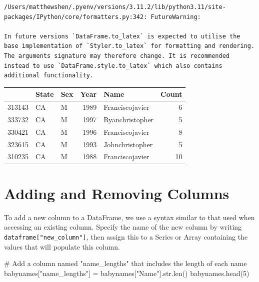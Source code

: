 \documentclass[
  letterpaper,
  DIV=11,
  numbers=noendperiod]{scrreprt}
\newenvironment{Shaded}{\begin{snugshade}}{\end{snugshade}}
\newcommand{\BuiltInTok}[1]{\textcolor[rgb]{0.00,0.23,0.31}{#1}}
\newcommand{\CommentTok}[1]{\textcolor[rgb]{0.37,0.37,0.37}{#1}}
\newcommand{\DecValTok}[1]{\textcolor[rgb]{0.68,0.00,0.00}{#1}}
\newcommand{\NormalTok}[1]{\textcolor[rgb]{0.00,0.23,0.31}{#1}}
\newcommand{\OperatorTok}[1]{\textcolor[rgb]{0.37,0.37,0.37}{#1}}
\newcommand{\StringTok}[1]{\textcolor[rgb]{0.13,0.47,0.30}{#1}}
\begin{document}
\begin{verbatim}
/Users/matthewshen/.pyenv/versions/3.11.2/lib/python3.11/site-packages/IPython/core/formatters.py:342: FutureWarning:

In future versions `DataFrame.to_latex` is expected to utilise the base implementation of `Styler.to_latex` for formatting and rendering. The arguments signature may therefore change. It is recommended instead to use `DataFrame.style.to_latex` which also contains additional functionality.
\end{verbatim}

\begin{tabular}{lllrlr}
\toprule
{} & State & Sex &  Year &             Name &  Count \\
\midrule
313143 &    CA &   M &  1989 &  Franciscojavier &      6 \\
333732 &    CA &   M &  1997 &  Ryanchristopher &      5 \\
330421 &    CA &   M &  1996 &  Franciscojavier &      8 \\
323615 &    CA &   M &  1993 &  Johnchristopher &      5 \\
310235 &    CA &   M &  1988 &  Franciscojavier &     10 \\
\bottomrule
\end{tabular}

\hypertarget{adding-and-removing-columns}{%
\section{Adding and Removing
Columns}\label{adding-and-removing-columns}}

To add a new column to a DataFrame, we use a syntax similar to that used
when accessing an existing column. Specify the name of the new column by
writing \texttt{dataframe{[}"new\_column"{]}}, then assign this to a
Series or Array containing the values that will populate this column.

\begin{Shaded}
\begin{Highlighting}[]
\CommentTok{\# Add a column named "name\_lengths" that includes the length of each name}
\NormalTok{babynames[}\StringTok{"name\_lengths"}\NormalTok{] }\OperatorTok{=}\NormalTok{ babynames[}\StringTok{"Name"}\NormalTok{].}\BuiltInTok{str}\NormalTok{.}\BuiltInTok{len}\NormalTok{()}
\NormalTok{babynames.head(}\DecValTok{5}\NormalTok{)}
\end{Highlighting}
\end{Shaded}
\end{document}
